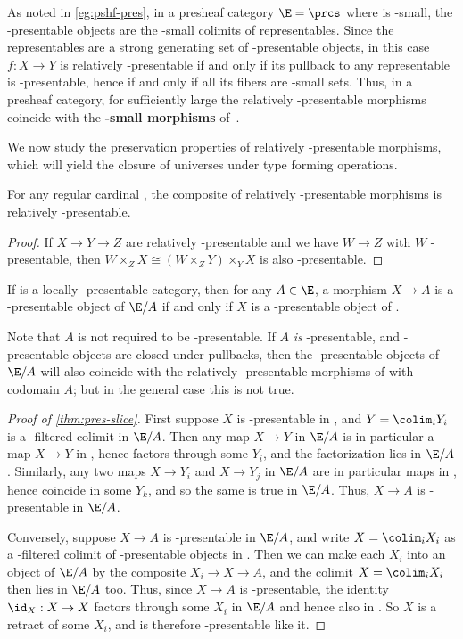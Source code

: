 \begin{eg}\label{eg:pshf-relpres}
  As noted in \cref{eg:pshf-pres}, in a presheaf category $\E=\prcs$ where \C is \ka-small, the \ka-presentable objects are the \ka-small colimits of representables.
  Since the representables are a strong generating set of \om-presentable objects, in this case $f:X\to Y$ is relatively \ka-presentable if and only if its pullback to any representable is \ka-presentable, hence if and only if all its fibers are \ka-small sets.
  Thus, in a presheaf category, for sufficiently large \ka the relatively \ka-presentable morphisms coincide with the \textbf{\ka-small morphisms} of~\cite{klv:ssetmodel,shulman:elreedy}.
\end{eg}

We now study the preservation properties of relatively \ka-presentable morphisms, which will yield the closure of universes under type forming operations.

\begin{lem}\label{thm:relpres-comp}
  For any regular cardinal \ka, the composite of relatively \ka-presentable morphisms is relatively \ka-presentable.
\end{lem}
\begin{proof}
  If $X\to Y\to Z$ are relatively \ka-presentable and we have $W\to Z$ with $W$ \ka-presentable, then $W\times_Z X \cong (W\times_Z Y) \times_Y X$ is also \ka-presentable.
\end{proof}

\begin{lem}\label{thm:pres-slice}
  If \E is a locally \la-presentable category, then for any $A\in \E$, a morphism $X\to A$ is a \la-presentable object of $\E/A$ if and only if $X$ is a \la-presentable object of \E.
\end{lem}
Note that $A$ is not required to be \la-presentable.
If $A$ \emph{is} \la-presentable, and \la-presentable objects are closed under pullbacks, then the \la-presentable objects of $\E/A$ will also coincide with the relatively \la-presentable morphisms of \E with codomain $A$; but in the general case this is not true.
\begin{proof}[Proof of \cref{thm:pres-slice}]
  First suppose $X$ is \la-presentable in \E, and $Y = \colim_i Y_i$ is a \la-filtered colimit in $\E/A$.
  Then any map $X\to Y$ in $\E/A$ is in particular a map $X\to Y$ in \E, hence factors through some $Y_i$, and the factorization lies in $\E/A$.
  Similarly, any two maps $X\to Y_i$ and $X\to Y_j$ in $\E/A$ are in particular maps in \E, hence coincide in some $Y_k$, and so the same is true in $\E/A$.
  Thus, $X\to A$ is \la-presentable in $\E/A$.

  Conversely, suppose $X\to A$ is \la-presentable in $\E/A$, and write $X = \colim_i X_i$ as a \la-filtered colimit of \la-presentable objects in \E.
  Then we can make each $X_i$ into an object of $\E/A$ by the composite $X_i \to X\to A$, and the colimit $X = \colim_i X_i$ then lies in $\E/A$ too.
  Thus, since $X\to A$ is \la-presentable, the identity $\id_X : X\to X$ factors through some $X_i$ in $\E/A$ and hence also in \E.
  So $X$ is a retract of some $X_i$, and is therefore \la-presentable like it.
\end{proof}

